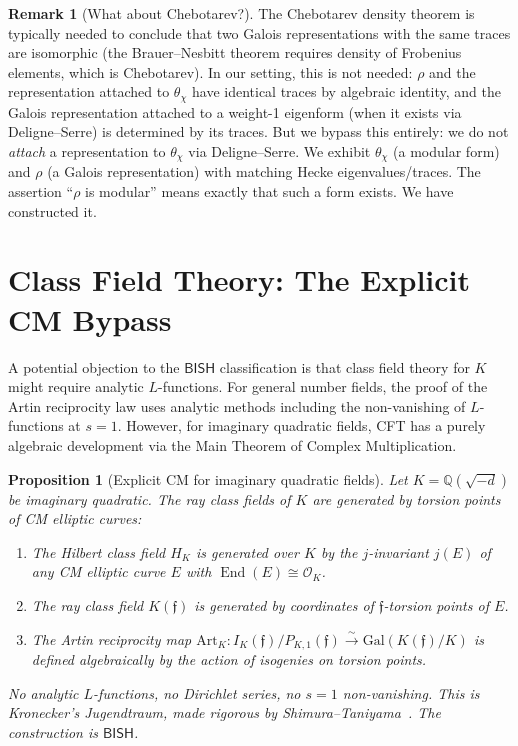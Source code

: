 \documentclass[11pt,a4paper]{article}
\theoremstyle{plain}
\newtheorem{proposition}[theorem]{Proposition}
\theoremstyle{definition}
\newtheorem{remark}[theorem]{Remark}
\newcommand{\BISH}{\textsf{BISH}}
\newcommand{\Q}{\mathbb{Q}}
\newcommand{\Gal}{\mathrm{Gal}}
\DeclareMathOperator{\End}{End}
\begin{document}
\begin{remark}[What about Chebotarev?]\label{rem:chebotarev}
The Chebotarev density theorem is typically needed to conclude that two Galois representations with the same traces are isomorphic (the Brauer--Nesbitt theorem requires density of Frobenius elements, which is Chebotarev).
In our setting, this is not needed: $\rho$ and the representation attached to $\theta_\chi$ have identical traces by algebraic identity, and the Galois representation attached to a weight-1 eigenform (when it exists via Deligne--Serre) is determined by its traces.
But we bypass this entirely: we do not \emph{attach} a representation to $\theta_\chi$ via Deligne--Serre.
We exhibit $\theta_\chi$ (a modular form) and $\rho$ (a Galois representation) with matching Hecke eigenvalues/traces.
The assertion ``$\rho$ is modular'' means exactly that such a form exists.
We have constructed it.
\end{remark}


\section{Class Field Theory: The Explicit CM Bypass}\label{sec:cft}

A potential objection to the $\BISH$ classification is that class field theory for $K$ might require analytic $L$-functions.
For general number fields, the proof of the Artin reciprocity law uses analytic methods including the non-vanishing of $L$-functions at $s = 1$.
However, for imaginary quadratic fields, CFT has a purely algebraic development via the Main Theorem of Complex Multiplication.

\begin{proposition}[Explicit CM for imaginary quadratic fields]\label{prop:cm-cft}
Let $K = \Q(\sqrt{-d})$ be imaginary quadratic. The ray class fields of $K$ are generated by torsion points of CM elliptic curves:
\begin{enumerate}[label=(\alph*)]
\item The Hilbert class field $H_K$ is generated over $K$ by the $j$-invariant $j(E)$ of any CM elliptic curve $E$ with $\End(E) \cong \mathcal{O}_K$.
\item The ray class field $K(\mathfrak{f})$ is generated by coordinates of $\mathfrak{f}$-torsion points of $E$.
\item The Artin reciprocity map $\mathrm{Art}_K : I_K(\mathfrak{f})/P_{K,1}(\mathfrak{f}) \xrightarrow{\sim} \Gal(K(\mathfrak{f})/K)$ is defined algebraically by the action of isogenies on torsion points.
\end{enumerate}
No analytic $L$-functions, no Dirichlet series, no $s = 1$ non-vanishing. This is Kronecker's Jugendtraum, made rigorous by Shimura--Taniyama~\cite{shimura-taniyama61}. The construction is $\BISH$.
\end{proposition}
\end{document}
